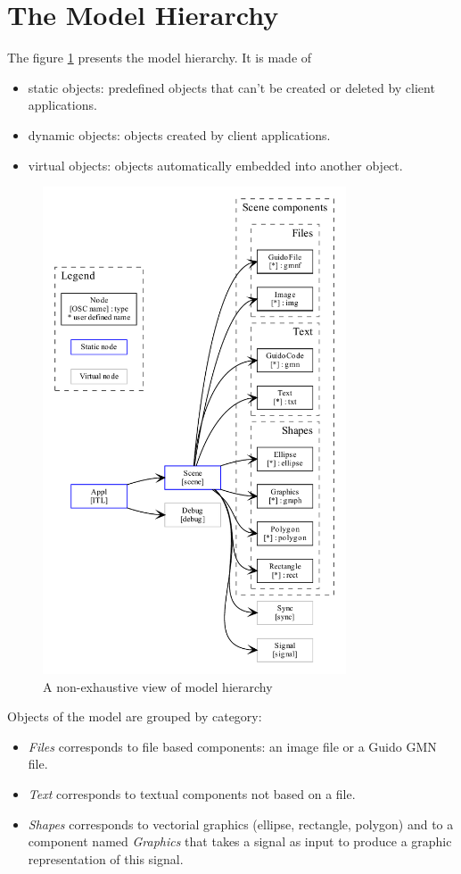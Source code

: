 \documentclass[a4paper]{article}
\begin{document}
\section{The Model Hierarchy}

The figure \ref{model} presents the model hierarchy. It is made of 
\begin{itemize}
\item static objects: predefined objects that can't be created or deleted by client applications.
\item dynamic objects: objects created by client applications.
\item virtual objects: objects automatically embedded into another object.
\end{itemize}

\begin{figure}[h]
	\centering \includegraphics[width=90mm]{rsrc/model}
 \caption{A non-exhaustive view of model hierarchy}
 \label{model}
\end{figure}

Objects of the model are grouped by category:
\begin{itemize}
\item \emph{Files} corresponds to file based components: an image file or a Guido GMN file. 
\item \emph{Text} corresponds to textual components not based on a file.
\item \emph{Shapes} corresponds to vectorial graphics (ellipse, rectangle, polygon) and to a component named \emph{Graphics} that takes a signal as input to produce a graphic representation of this signal.
\end{itemize}
\end{document}
